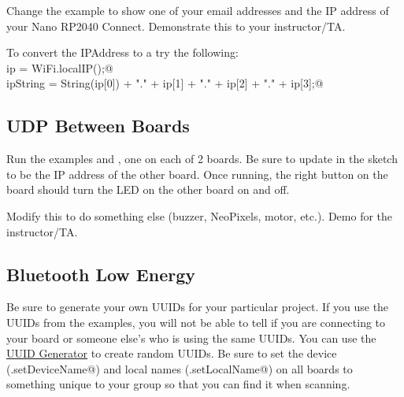 Change the example to show one of your email addresses and the IP address of your 
Nano RP2040 Connect. Demonstrate this to your instructor/TA.

To convert the IPAddress to a \lstinline@String@ try the following:\\
\lstinline@IPAddress ip = WiFi.localIP();@\\
\lstinline@String ipString = String(ip[0]) + "." + ip[1] + "." + ip[2] + "." + ip[3];@

\subsection{UDP Between Boards}
Run the examples \lstinline@WiFiUdpSend@ and \lstinline@WiFiUdpReceiveSend@, one 
on each of 2 boards. Be sure to update \lstinline@remoteIp@ in the 
\lstinline@WiFiUdpSend@ sketch to be the IP address of the other board. Once 
running, the right button on the \lstinline@@ board should turn the LED on 
the other board on and off.

Modify this to do something else (buzzer, NeoPixels, motor, etc.). Demo for the 
instructor/TA.

\subsection{Bluetooth Low Energy}
Be sure to generate your own UUIDs for your particular project. If you use
the UUIDs from the examples, you will not be able to tell if you are connecting
to your board or someone else's who is using the same UUIDs. You can use the 
\href{https://www.uuidgenerator.net/}{UUID Generator} to create random UUIDs.
Be sure to set the device (\lstinline@BLE.setDeviceName@) and local names 
(\lstinline@BLE.setLocalName@) on all boards to something unique to 
your group so that you can find it when scanning.

